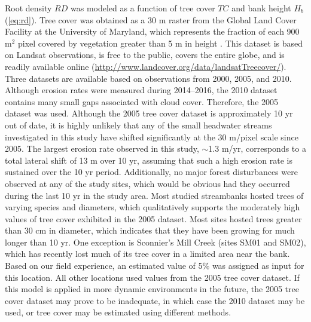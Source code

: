 \documentclass[preprint, review, authoryear, 12pt]{elsarticle}
\begin{document}
Root density $\textit{RD}$ was modeled as a function of tree cover $\mathit{TC}$ and bank height $H_b$ (\cref{eq:rd}). Tree cover was obtained as a 30 m raster from the Global Land Cover Facility at the University of Maryland, which represents the fraction of each 900 m$^2$ pixel covered by vegetation greater than 5 m in height \citep{Sexton2013}. This dataset is based on Landsat observations, is free to the public, covers the entire globe, and is readily available online (\url{http://www.landcover.org/data/landsatTreecover/}). Three datasets are available based on observations from 2000, 2005, and 2010. Although erosion rates were measured during 2014--2016, the 2010 dataset contains many small gaps associated with cloud cover. Therefore, the 2005 dataset was used. Although the 2005 tree cover dataset is approximately 10 yr out of date, it is highly unlikely that any of the small headwater streams investigated in this study have shifted significantly at the 30 m/pixel scale since 2005. The largest erosion rate observed in this study, $\sim$1.3 m/yr, corresponds to a total lateral shift of 13 m over 10 yr, assuming that such a high erosion rate is sustained over the 10 yr period. Additionally, no major forest disturbances were observed at any of the study sites, which would be obvious had they occurred during the last 10 yr in the study area. Most studied streambanks hosted trees of varying species and diameters, which qualitatively supports the moderately high values of tree cover exhibited in the 2005 dataset. Most sites hosted trees greater than 30 cm in diameter, which indicates that they have been growing for much longer than 10 yr. One exception is Sconnier's Mill Creek (sites SM01 and SM02), which has recently lost much of its tree cover in a limited area near the bank. Based on our field experience, an estimated value of 5\% was assigned as input for this location. All other locations used values from the 2005 tree cover dataset. If this model is applied in more dynamic environments in the future, the 2005 tree cover dataset may prove to be inadequate, in which case the 2010 dataset may be used, or tree cover may be estimated using different methods.
\end{document}
